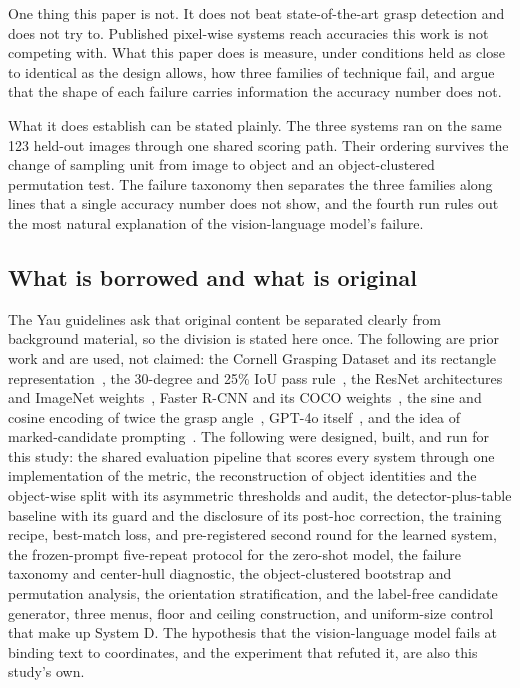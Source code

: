 \documentclass[12pt,letterpaper]{article}
\begin{document}
One thing this paper is not. It does not beat state-of-the-art grasp
detection and does not try to. Published pixel-wise systems reach
accuracies this work is not competing with. What this paper does is
measure, under conditions held as close to identical as the design
allows, how three families of technique fail, and argue that the shape
of each failure carries information the accuracy number does not.

What it does establish can be stated plainly. The three systems ran on
the same 123 held-out images through one shared scoring path. Their
ordering survives the change of sampling unit from image to object and
an object-clustered permutation test. The failure taxonomy then
separates the three families along lines that a single accuracy number
does not show, and the fourth run rules out the most natural
explanation of the vision-language model's failure.


\subsection{What is borrowed and what is original}

The Yau guidelines ask that original content be separated clearly from
background material, so the division is stated here once. The following
are prior work and are used, not claimed: the Cornell Grasping Dataset
and its rectangle representation~\cite{jiang2011}, the 30-degree and
25\% IoU pass rule~\cite{lenz2015}, the ResNet architectures and
ImageNet weights~\cite{he2016}, Faster R-CNN and its COCO
weights~\cite{ren2015}, the sine and cosine encoding of twice the grasp
angle~\cite{redmon2015,morrison2018}, GPT-4o itself~\cite{openai2024},
and the idea of marked-candidate prompting~\cite{yang2024}. The
following were designed, built, and run for this study: the shared
evaluation pipeline that scores every system through one implementation
of the metric, the reconstruction of object identities and the
object-wise split with its asymmetric thresholds and audit, the
detector-plus-table baseline with its guard and the disclosure of its
post-hoc correction, the training recipe, best-match loss, and
pre-registered second round for the learned system, the frozen-prompt
five-repeat protocol for the zero-shot model, the failure taxonomy and
center-hull diagnostic, the object-clustered bootstrap and permutation
analysis, the orientation stratification, and the label-free
candidate generator, three menus, floor and ceiling construction, and
uniform-size control that make up System D. The hypothesis that the
vision-language model fails at binding text to coordinates, and the
experiment that refuted it, are also this study's own.
\end{document}
